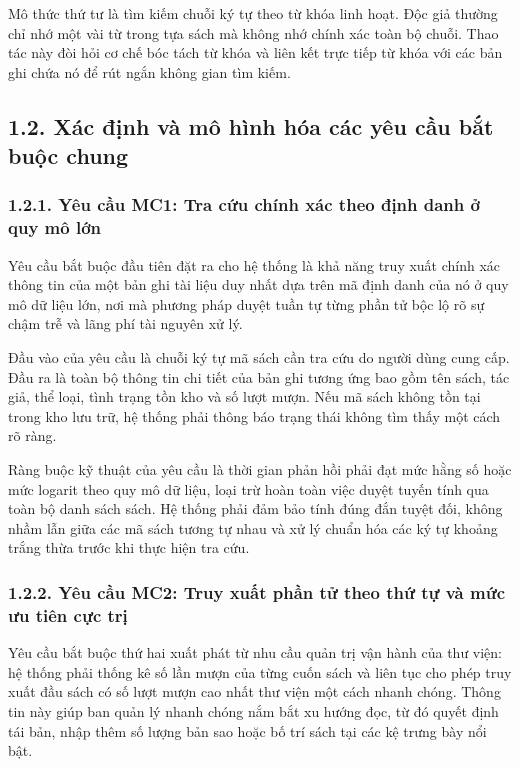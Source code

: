 \documentclass[14pt,a4paper]{extarticle}
\begin{document}
Mô thức thứ tư là tìm kiếm chuỗi ký tự theo từ khóa linh hoạt. Độc giả thường chỉ nhớ một vài từ trong tựa sách mà không nhớ chính xác toàn bộ chuỗi. Thao tác này đòi hỏi cơ chế bóc tách từ khóa và liên kết trực tiếp từ khóa với các bản ghi chứa nó để rút ngắn không gian tìm kiếm.

\subsection*{1.2. Xác định và mô hình hóa các yêu cầu bắt buộc chung}

\subsubsection*{1.2.1. Yêu cầu MC1: Tra cứu chính xác theo định danh ở quy mô lớn}

Yêu cầu bắt buộc đầu tiên đặt ra cho hệ thống là khả năng truy xuất chính xác thông tin của một bản ghi tài liệu duy nhất dựa trên mã định danh của nó ở quy mô dữ liệu lớn, nơi mà phương pháp duyệt tuần tự từng phần tử bộc lộ rõ sự chậm trễ và lãng phí tài nguyên xử lý.

Đầu vào của yêu cầu là chuỗi ký tự mã sách cần tra cứu do người dùng cung cấp. Đầu ra là toàn bộ thông tin chi tiết của bản ghi tương ứng bao gồm tên sách, tác giả, thể loại, tình trạng tồn kho và số lượt mượn. Nếu mã sách không tồn tại trong kho lưu trữ, hệ thống phải thông báo trạng thái không tìm thấy một cách rõ ràng.

Ràng buộc kỹ thuật của yêu cầu là thời gian phản hồi phải đạt mức hằng số hoặc mức logarit theo quy mô dữ liệu, loại trừ hoàn toàn việc duyệt tuyến tính qua toàn bộ danh sách sách. Hệ thống phải đảm bảo tính đúng đắn tuyệt đối, không nhầm lẫn giữa các mã sách tương tự nhau và xử lý chuẩn hóa các ký tự khoảng trắng thừa trước khi thực hiện tra cứu.

\subsubsection*{1.2.2. Yêu cầu MC2: Truy xuất phần tử theo thứ tự và mức ưu tiên cực trị}

Yêu cầu bắt buộc thứ hai xuất phát từ nhu cầu quản trị vận hành của thư viện: hệ thống phải thống kê số lần mượn của từng cuốn sách và liên tục cho phép truy xuất đầu sách có số lượt mượn cao nhất thư viện một cách nhanh chóng. Thông tin này giúp ban quản lý nhanh chóng nắm bắt xu hướng đọc, từ đó quyết định tái bản, nhập thêm số lượng bản sao hoặc bố trí sách tại các kệ trưng bày nổi bật.
\end{document}
